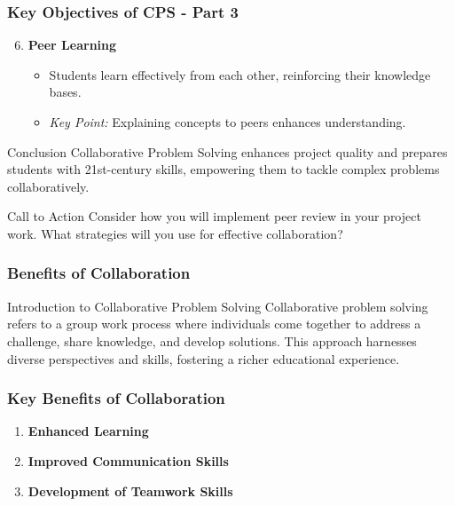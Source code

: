 \documentclass{beamer}
\begin{document}
\begin{frame}[fragile]
    \frametitle{Key Objectives of CPS - Part 3}
    \begin{enumerate}
        \setcounter{enumi}{5} %
        \item \textbf{Peer Learning}
        \begin{itemize}
            \item Students learn effectively from each other, reinforcing their knowledge bases.
            \item \textit{Key Point:} Explaining concepts to peers enhances understanding.
        \end{itemize}
    \end{enumerate}

    \begin{block}{Conclusion}
        Collaborative Problem Solving enhances project quality and prepares students with 21st-century skills, empowering them to tackle complex problems collaboratively.
    \end{block}

    \begin{block}{Call to Action}
        Consider how you will implement peer review in your project work. What strategies will you use for effective collaboration?
    \end{block}
\end{frame}

\begin{frame}[fragile]
    \frametitle{Benefits of Collaboration}
    \begin{block}{Introduction to Collaborative Problem Solving}
        Collaborative problem solving refers to a group work process where individuals come together to address a challenge, share knowledge, and develop solutions. This approach harnesses diverse perspectives and skills, fostering a richer educational experience.
    \end{block}
\end{frame}

\begin{frame}[fragile]
    \frametitle{Key Benefits of Collaboration}
    \begin{enumerate}
        \item \textbf{Enhanced Learning}
        \item \textbf{Improved Communication Skills}
        \item \textbf{Development of Teamwork Skills}
    \end{enumerate}
\end{frame}
\end{document}
